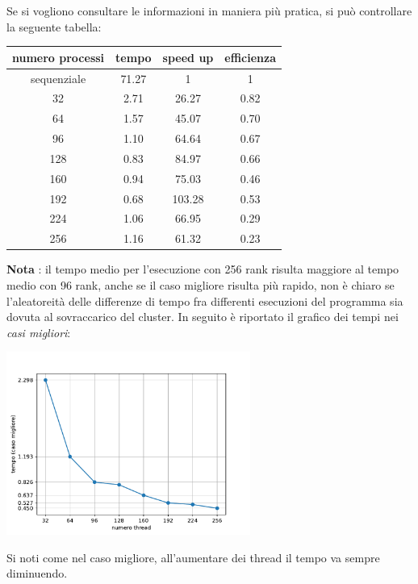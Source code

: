 \documentclass[12pt,openany]{report}
\begin{document}
\newpage
Se si vogliono consultare le informazioni in maniera più pratica, si può controllare la seguente tabella:
\begin{center}
    \begin{tabular}{|c|c|c|c|}
        \hline
        \rowcolor[HTML]{EFEFEF} 
        numero processi & tempo   & speed up & efficienza   \\ \hline
        sequenziale      & 71.27 & 1         & 1 \\ \hline
        32               & 2.71  & 26.27 & 0.82 \\ \hline
        64               & 1.57   & 45.07 & 0.70 \\ \hline
        96               & 1.10  & 64.64 & 0.67 \\ \hline
        128              & 0.83  & 84.97 & 0.66 \\ \hline
        160              & 0.94  & 75.03 & 0.46 \\ \hline
        192              & 0.68    & 103.28 & 0.53 \\ \hline
        224              & 1.06  & 66.95 & 0.29 \\ \hline
        256              & 1.16  & 61.32  & 0.23 \\ \hline
    \end{tabular}
\end{center}
\textbf{Nota} : il tempo medio per l'esecuzione con 256 rank risulta maggiore al tempo medio con 96 rank, anche se il caso migliore risulta più rapido, non è chiaro se l'aleatoreità delle differenze di tempo fra differenti esecuzioni del programma sia dovuta al sovraccarico del cluster. In seguito è riportato il grafico dei tempi nei \textit{casi migliori}:
\begin{center}
    \includegraphics[width=0.6\textwidth ]{images/tempi_MPI_bestcase.pdf}
\end{center}
Si noti come nel caso migliore, all'aumentare dei thread il tempo va sempre diminuendo.
\end{document}
